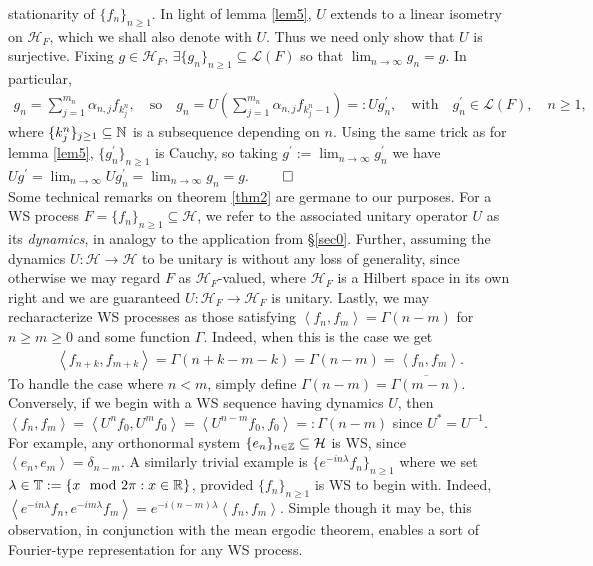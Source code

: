 \documentclass[11pt]{report}
\newcommand{\mc}[1]{\mathcal{#1}}
\newcommand{\ip}[2]{\left\langle#1,#2\right\rangle }
\newcommand{\1}[1]{\mathbbm{1}_{\{#1\}}}
\theoremstyle{definition}
\begin{document}
    stationarity of $\{f_n\}_{n\geq 1}$. In light of lemma \ref{lem5}, $U$
    extends to a linear isometry on $\mc{H}_F$, which we shall also denote with
    $U$. Thus we need only show that $U$ is surjective. Fixing $g\in\mc{H}_F$,
    $\exists \{g_n\}_{n\geq 1}\subseteq\mc{L}(F)$ so that
    $\lim_{n\rightarrow\infty}g_n=g$. In particular,
    \begin{align*}
        g_n=\sum_{j=1}^{m_n}\alpha_{n,j}f_{k^n_j},\quad\text{so}\quad g_n=U\left(\sum_{j=1}^{m_n}\alpha_{n,j}f_{k^n_j-1}\right)=:Ug^\prime_n,\quad\text{with}\quad g^\prime_n\in\mc{L}(F),\quad n\geq 1,
    \end{align*}
    where $\{k^n_j\}_{j\geq 1}\subseteq\mathbb{N}$ is a subsequence depending on
    $n$. Using the same trick as for lemma \ref{lem5}, $\{g_n^\prime\}_{n\geq
    1}$ is Cauchy, so taking $g^\prime:=\lim_{n\rightarrow\infty}g^\prime_n$ we
    have
    $Ug^\prime=\lim_{n\rightarrow\infty}Ug^\prime_n=\lim_{n\rightarrow\infty}g_n=g$.
    \hfill{$\qed$}\\[5pt]
    \indent Some technical remarks on theorem \ref{thm2} are germane to our
    purposes. For a WS process $F=\{f_n\}_{n\geq 1}\subseteq\mc{H}$, we refer to
    the associated unitary operator $U$ as its \textit{dynamics}, in analogy to
    the application from \S \ref{sec0}. Further, assuming the dynamics
    $U:\mc{H}\rightarrow\mc{H}$ to be unitary is without any loss of generality,
    since otherwise we may regard $F$ as $\mc{H}_F$-valued, where $\mc{H}_F$ is
    a Hilbert space in its own right and we are guaranteed
    $U:\mc{H}_F\rightarrow\mc{H}_F$ is unitary. Lastly, we may recharacterize WS
    processes as those satisfying $\ip{f_n}{f_m}=\Gamma(n-m)$ for $n\geq m\geq
    0$ and some function $\Gamma$. Indeed, when this is the case we get
    \begin{align*}
        \ip{f_{n+k}}{f_{m+k}}=\Gamma(n+k-m-k)=\Gamma(n-m)=\ip{f_n}{f_m}.
    \end{align*}
    To handle the case where $n<m$, simply define
    $\Gamma(n-m)=\overline{\Gamma(m-n)}$. Conversely, if we begin with a WS
    sequence having dynamics $U$, then
    $\ip{f_n}{f_m}=\ip{U^nf_0}{U^mf_0}=\ip{U^{n-m}f_0}{f_0}=:\Gamma(n-m)$ since
    $U^\ast=U^{-1}$. For example, any orthonormal system
    $\{e_n\}_{n\in\mbb{Z}}\subseteq\mc{H}$ is WS, since
    $\ip{e_n}{e_m}=\delta_{n-m}$. A similarly trivial example is
    $\{e^{-in\lambda}f_n\}_{n\geq 1}$ where we set
    $\lambda\in\mathbb{T}:=\{x\mod2\pi:x\in\mathbb{R}\}$, provided $\{f_n\}_{n\geq 1}$
    is WS to begin with. Indeed,
    $\ip{e^{-in\lambda}f_n}{e^{-im\lambda}f_m}=e^{-i(n-m)\lambda}\ip{f_n}{f_m}$.
    Simple though it may be, this observation, in conjunction with the mean
    ergodic theorem, enables a sort of Fourier-type representation for any WS
    process.
\end{document}
